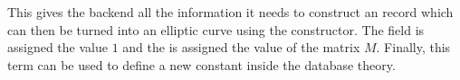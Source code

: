 This gives the backend all the information it needs to construct an \mmt record which can
then be turned into an elliptic curve using the  constructor.
The  field is assigned the value
$1$ and the  is assigned the value of the matrix $M$.  Finally,
this \mmt term can be used to define a new constant inside the database theory.


